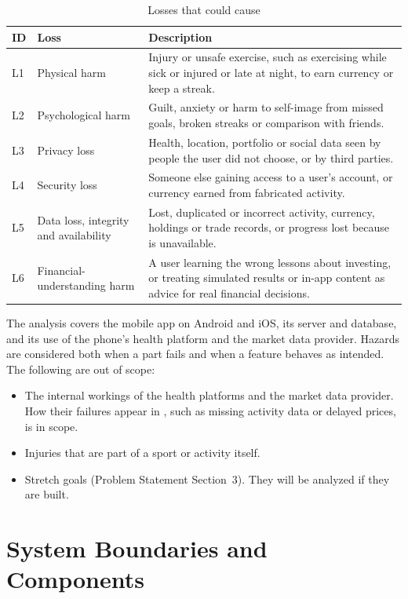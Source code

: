 \documentclass{article}
\begin{document}
\begin{table}[H]
\centering
\caption{Losses that \progname{} could cause}
\label{TblLosses}
\begin{tabularx}{\textwidth}{lp{3.2cm}X}
\toprule
\textbf{ID} & \textbf{Loss} & \textbf{Description}\\
\midrule
L1 & Physical harm & Injury or unsafe exercise, such as exercising while sick
or injured or late at night, to earn currency or keep a streak.\\
\addlinespace
L2 & Psychological harm & Guilt, anxiety or harm to self-image from missed
goals, broken streaks or comparison with friends.\\
\addlinespace
L3 & Privacy loss & Health, location, portfolio or social data seen by people
the user did not choose, or by third parties.\\
\addlinespace
L4 & Security loss & Someone else gaining access to a user's account, or
currency earned from fabricated activity.\\
\addlinespace
L5 & Data loss, integrity and availability & Lost, duplicated or incorrect
activity, currency, holdings or trade records, or progress lost because
\progname{} is unavailable.\\
\addlinespace
L6 & Financial-understanding harm & A user learning the wrong lessons about
investing, or treating simulated results or in-app content as advice for real
financial decisions.\\
\bottomrule
\end{tabularx}
\end{table}

The analysis covers the \progname{} mobile app on Android and iOS, its server
and database, and its use of the phone's health platform and the market data
provider. Hazards are considered both when a part fails and when a feature
behaves as intended. The following are out of scope:
\begin{itemize}
  \item The internal workings of the health platforms and the market data
  provider. How their failures appear in \progname{}, such as missing activity
  data or delayed prices, is in scope.
  \item Injuries that are part of a sport or activity itself.
  \item Stretch goals (Problem Statement Section~3). They will be analyzed if
  they are built.
\end{itemize}

\section{System Boundaries and Components} \label{SecBoundaries}
\end{document}
